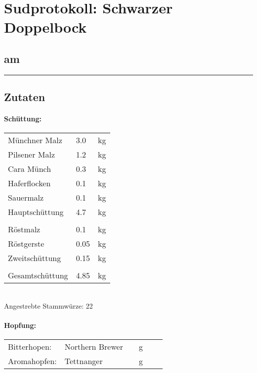 \documentclass[12pt,oneside,a4paper]{scrartcl}
\begin{document}
	\begin{minipage}[c]{0.70\textwidth}
		\section*{\hspace{-.4cm}Sudprotokoll: Schwarzer Doppelbock}
	\end{minipage}
	\begin{minipage}[c]{0.29\textwidth}
		\subsection*{am }
	\end{minipage}
	\rule{\textwidth}{1pt}
%
\subsection*{Zutaten}
%
\paragraph{Schüttung:}
	\begin{tabular}[t]{m{8cm} m{2cm} m{1cm}}
		Münchner Malz & \num{3,0} & \si{\kilogram} \bigstrut\\
		Pilsener Malz & \num{1,2} & \si{\kilogram} \bigstrut\\
		Cara Münch & \num{0,3} & \si{\kilogram} \bigstrut\\
		Haferflocken & \num{0,1} & \si{\kilogram} \bigstrut\\ 
		Sauermalz & \num{0,1} & \si{\kilogram} \bigstrut\\\hline
		Hauptschüttung & \num{4,7} & \si{\kilogram} \bigstrut\\
		&&\\
		Röstmalz & \num{0,1} & \si{\kilogram} \bigstrut\\
		Röstgerste & \num{0,05} & \si{\kilogram} \bigstrut\\ \hline
		Zweitschüttung & \num{0,15} & \si{\kilogram} \bigstrut\\
		&&\\\hline\hline
		Gesamtschüttung & \num{4,85} & \si{\kilogram} \bigstrut
	\end{tabular}\\

\vspace{.25cm}
\hspace{1cm}Angestrebte Stammwürze: \SI{22}{\plato}
%
\paragraph{Hopfung:}
	\begin{tabular}[t]{m{2.5cm} m{5cm} m{0.5cm} m{1cm} m{0.5cm} m{1cm}}
		Bitterhopen: & Northern Brewer &  & \si{\gram} &  & \si{\peralpha} \\
		Aromahopfen: & Tettnanger & & \si{\gram} &  &  \si{\peralpha}
	\end{tabular}\\
\end{document}
